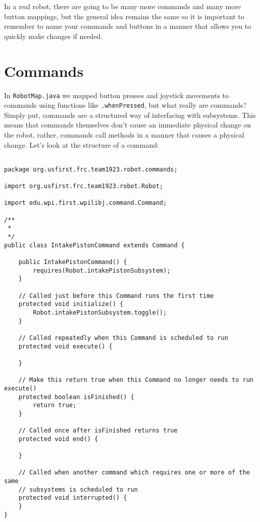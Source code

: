 \documentclass[11pt,fleqn]{article}
\begin{document}
In a real robot, there are going to be many more commands and many more button mappings, but the general
idea remains the same so it is important to remember to name your commands and buttons in a manner that
allows you to quickly make changes if needed. 

\section{Commands}
In \texttt{RobotMap.java} we mapped button presses and joystick movements to commands using
functions like \texttt{.whenPressed}, but what really are commands? Simply put, commands are a
structured way of interfacing with subsystems. This means that commands themselves don't cause an
immediate physical change on the robot, rather, commands call methods in a manner that causes a
physical change. Let's look at the structure of a command:

\begin{verbatim}

package org.usfirst.frc.team1923.robot.commands;

import org.usfirst.frc.team1923.robot.Robot;

import edu.wpi.first.wpilibj.command.Command;

/**
 *
 */
public class IntakePistonCommand extends Command {

    public IntakePistonCommand() {
        requires(Robot.intakePistonSubsystem);
    }

    // Called just before this Command runs the first time
    protected void initialize() {
        Robot.intakePistonSubsystem.toggle();
    }

    // Called repeatedly when this Command is scheduled to run
    protected void execute() {

    }

    // Make this return true when this Command no longer needs to run execute()
    protected boolean isFinished() {
        return true;
    }

    // Called once after isFinished returns true
    protected void end() {
        
    }

    // Called when another command which requires one or more of the same
    // subsystems is scheduled to run
    protected void interrupted() {
    }
}
\end{verbatim}
\end{document}
